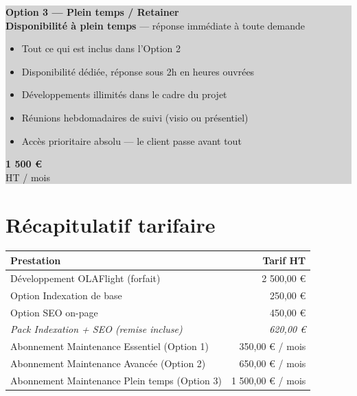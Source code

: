 \documentclass[a4paper,11pt]{article}
\begin{document}
\colorbox{lightgray}{\parbox{\textwidth}{
  \vspace{6pt}
  \begin{minipage}{0.72\textwidth}
    \textbf{\color{primary}\large Option 3 — Plein temps / Retainer}\\[3pt]
    \textbf{Disponibilité à plein temps} — réponse immédiate à toute demande\\[4pt]
    \begin{itemize}[leftmargin=*, noitemsep, topsep=2pt]
      \item Tout ce qui est inclus dans l'Option 2
      \item Disponibilité dédiée, réponse sous 2h en heures ouvrées
      \item Développements illimités dans le cadre du projet
      \item Réunions hebdomadaires de suivi (visio ou présentiel)
      \item Accès prioritaire absolu — le client passe avant tout
    \end{itemize}
  \end{minipage}
  \hfill
  \begin{minipage}{0.24\textwidth}
    \centering
    \colorbox{primary}{\parbox{0.9\textwidth}{
      \centering\color{white}\vspace{4pt}
      {\large\bfseries 1 500 €}\\{\small HT / mois}
      \vspace{4pt}
    }}
  \end{minipage}
  \vspace{6pt}
}}

\vspace{14pt}

\section{Récapitulatif tarifaire}

\begin{tabularx}{\textwidth}{X r}
  \toprule
  \rowcolor{primary}
  \color{white}\textbf{Prestation} & \color{white}\textbf{Tarif HT} \\
  \midrule
  Développement OLAFlight (forfait) & 2 500,00 € \\
  \midrule
  \rowcolor{lightgray}
  Option Indexation de base & 250,00 € \\
  Option SEO on-page & 450,00 € \\
  \rowcolor{lightgray}
  \textit{Pack Indexation + SEO (remise incluse)} & \textit{620,00 €} \\
  \midrule
  Abonnement Maintenance Essentiel (Option 1) & 350,00 € / mois \\
  \rowcolor{lightgray}
  Abonnement Maintenance Avancée (Option 2) & 650,00 € / mois \\
  Abonnement Maintenance Plein temps (Option 3) & 1 500,00 € / mois \\
  \bottomrule
\end{tabularx}
\end{document}
